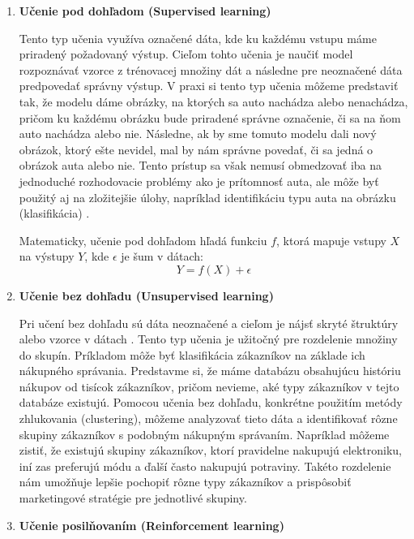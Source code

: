 \begin{enumerate}
\item \textbf{Učenie pod dohľadom (Supervised learning)}

Tento typ učenia využíva označené dáta, kde ku každému vstupu máme priradený požadovaný výstup. Cieľom tohto učenia je naučiť model rozpoznávať vzorce z trénovacej množiny dát a následne pre neoznačené dáta predpovedať správny výstup. V praxi si tento typ učenia môžeme predstaviť tak, že modelu dáme obrázky, na ktorých sa auto nachádza alebo nenachádza, pričom ku každému obrázku bude priradené správne označenie, či sa na ňom auto nachádza alebo nie. Následne, ak by sme tomuto modelu dali nový obrázok, ktorý ešte nevidel, mal by nám správne povedať, či sa jedná o obrázok auta alebo nie. Tento prístup sa však nemusí obmedzovať iba na jednoduché rozhodovacie problémy ako je prítomnosť auta, ale môže byť použitý aj na zložitejšie úlohy, napríklad identifikáciu typu auta na obrázku (klasifikácia) \cite{artificial_intelligence_modern_aproach}.

Matematicky, učenie pod dohľadom hľadá funkciu $f$, ktorá mapuje vstupy $X$ na výstupy $Y$, kde $\epsilon$ je šum v dátach:
\[
Y = f(X) + \epsilon
\]

\item \textbf{Učenie bez dohľadu (Unsupervised learning)}

Pri učení bez dohľadu sú dáta neoznačené a cieľom je nájsť skryté štruktúry alebo vzorce v dátach \cite{artificial_intelligence_modern_aproach}. Tento typ učenia je užitočný pre rozdelenie množiny do skupín. Príkladom môže byť klasifikácia zákazníkov na základe ich nákupného správania. Predstavme si, že máme databázu obsahujúcu históriu nákupov od tisícok zákazníkov, pričom nevieme, aké typy zákazníkov v tejto databáze existujú. Pomocou učenia bez dohľadu, konkrétne použitím metódy zhlukovania (clustering), môžeme analyzovať tieto dáta a identifikovať rôzne skupiny zákazníkov s podobným nákupným správaním. Napríklad môžeme zistiť, že existujú skupiny zákazníkov, ktorí pravidelne nakupujú elektroniku, iní zas preferujú módu a ďalší často nakupujú potraviny. Takéto rozdelenie nám umožňuje lepšie pochopiť rôzne typy zákazníkov a prispôsobiť marketingové stratégie pre jednotlivé skupiny.

\item \textbf{Učenie posilňovaním (Reinforcement learning)}


\end{enumerate}

